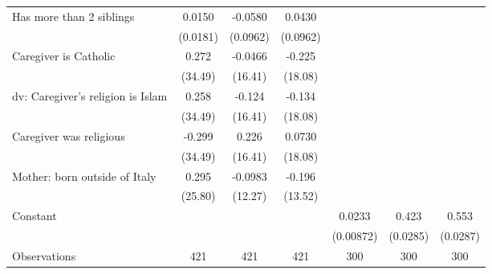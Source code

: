 {\begin{tabular}{l*{6}{c}}
\addlinespace
Has more than 2 siblings&      0.0150         &     -0.0580         &      0.0430         &                     &                     &                     \\
                    &    (0.0181)         &    (0.0962)         &    (0.0962)         &                     &                     &                     \\
\addlinespace
Caregiver is Catholic&       0.272         &     -0.0466         &      -0.225         &                     &                     &                     \\
                    &     (34.49)         &     (16.41)         &     (18.08)         &                     &                     &                     \\
\addlinespace
dv: Caregiver's religion is Islam&       0.258         &      -0.124         &      -0.134         &                     &                     &                     \\
                    &     (34.49)         &     (16.41)         &     (18.08)         &                     &                     &                     \\
\addlinespace
Caregiver was religious&      -0.299         &       0.226         &      0.0730         &                     &                     &                     \\
                    &     (34.49)         &     (16.41)         &     (18.08)         &                     &                     &                     \\
\addlinespace
Mother: born outside of Italy&       0.295         &     -0.0983         &      -0.196         &                     &                     &                     \\
                    &     (25.80)         &     (12.27)         &     (13.52)         &                     &                     &                     \\
\addlinespace
Constant            &                     &                     &                     &      0.0233\sym{**} &       0.423\sym{***}&       0.553\sym{***}\\
                    &                     &                     &                     &   (0.00872)         &    (0.0285)         &    (0.0287)         \\
\midrule
Observations        &         421         &         421         &         421         &         300         &         300         &         300         \\
\bottomrule
\end{tabular}
}
